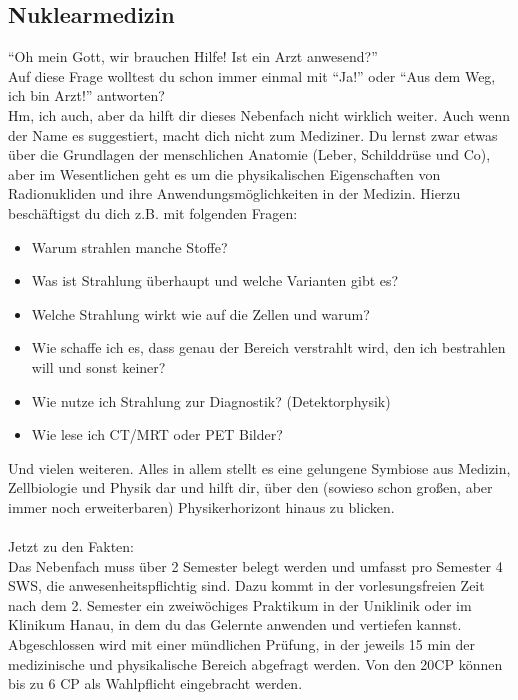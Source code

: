 \subsection{Nuklearmedizin}  %
\label{subsec:nuklearmedizin}
\enquote{Oh mein Gott, wir brauchen Hilfe! Ist ein Arzt anwesend?}\\
Auf diese Frage wolltest du schon immer einmal mit \enquote{Ja!} oder \enquote{Aus dem Weg, ich bin Arzt!} antworten?\\
Hm, ich auch, aber da hilft dir dieses Nebenfach nicht wirklich weiter. Auch wenn der Name es suggestiert,  macht dich nicht zum Mediziner. Du lernst zwar etwas \"uber die Grundlagen der menschlichen Anatomie (Leber, Schilddr\"use und Co), aber im Wesentlichen geht es um die physikalischen Eigenschaften von Radionukliden und ihre Anwendungsm\"oglichkeiten in der Medizin. Hierzu besch\"aftigst du dich z.B. mit folgenden Fragen:
\begin{itemize}
  \item{Warum strahlen manche Stoffe?}
  \item{Was ist Strahlung \"uberhaupt und welche Varianten gibt es?}
  \item{Welche Strahlung wirkt wie auf die Zellen und warum?}
  \item{Wie schaffe ich es, dass genau der Bereich verstrahlt wird, den ich bestrahlen will und sonst keiner?}
  \item{Wie nutze ich Strahlung zur Diagnostik? (Detektorphysik)}
  \item{Wie lese ich CT/MRT oder PET Bilder?}
\end{itemize}
Und vielen weiteren. Alles in allem stellt es eine gelungene Symbiose aus Medizin, Zellbiologie und Physik dar und hilft dir, \"uber den (sowieso schon gro\ss en, aber immer noch erweiterbaren) Physikerhorizont hinaus zu blicken.\\\\
Jetzt zu den Fakten:\\
Das Nebenfach muss \"uber 2 Semester belegt werden und umfasst pro Semester 4 SWS, die anwesenheitspflichtig sind. Dazu kommt in der vorlesungsfreien Zeit nach dem 2. Semester ein zweiw\"ochiges Praktikum in der Uniklinik oder im Klinikum Hanau, in dem du das Gelernte anwenden und vertiefen kannst.\\
Abgeschlossen wird  mit einer m\"undlichen Pr\"ufung,
in der jeweils 15 min der medizinische und physikalische Bereich abgefragt werden. Von den 20CP können bis zu 6 CP als Wahlpflicht eingebracht werden.
